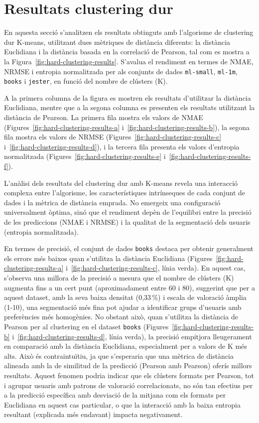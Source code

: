 \documentclass[a4paper,12pt]{report}
\begin{document}
\section{Resultats clustering dur}

En aquesta secció s'analitzen els resultats obtinguts amb l'algorisme de clustering dur K-means, utilitzant dues mètriques de distància diferents: la distància Euclidiana i la distància basada en la correlació de Pearson, tal com es mostra a la Figura~\ref{fig:hard-clustering-results}. S'avalua el rendiment en termes de NMAE, NRMSE i entropia normalitzada per als conjunts de dades \texttt{ml-small}, \texttt{ml-1m}, \texttt{books} i \texttt{jester}, en funció del nombre de clústers (K).

A la primera columna de la figura es mostren els resultats d'utilitzar la distància Euclidiana, mentre que a la segona columna es presenten els resultats utilitzant la distància de Pearson.
La primera fila mostra els valors de NMAE (Figures~\ref{fig:hard-clustering-results-a} i~\ref{fig:hard-clustering-results-b}), la segona fila mostra els valors de NRMSE (Figures~\ref{fig:hard-clustering-results-c} i~\ref{fig:hard-clustering-results-d}), i la tercera fila presenta els valors d'entropia normalitzada (Figures~\ref{fig:hard-clustering-results-e} i~\ref{fig:hard-clustering-results-f}).

L'anàlisi dels resultats del clustering dur amb K-means revela una interacció complexa entre l'algorisme, les característiques intrínseques de cada conjunt de dades i la mètrica de distància emprada. No emergeix una configuració universalment òptima, sinó que el rendiment depèn de l'equilibri entre la precisió de les prediccions (NMAE i NRMSE) i la qualitat de la segmentació dels usuaris (entropia normalitzada).

En termes de precisió, el conjunt de dades \texttt{books} destaca per obtenir generalment els errors més baixos quan s'utilitza la distància Euclidiana (Figures~\ref{fig:hard-clustering-results-a} i~\ref{fig:hard-clustering-results-c}, línia verda). En aquest cas, s'observa una millora de la precisió a mesura que el nombre de clústers (K) augmenta fins a un cert punt (aproximadament entre 60 i 80), suggerint que per a aquest dataset, amb la seva baixa densitat (0,33\,\%) i escala de valoració àmplia (1-10), una segmentació més fina pot ajudar a identificar grups d'usuaris amb preferències més homogènies. No obstant això, quan s'utilitza la distància de Pearson per al clustering en el dataset \texttt{books} (Figures~\ref{fig:hard-clustering-results-b} i~\ref{fig:hard-clustering-results-d}, línia verda), la precisió empitjora lleugerament en comparació amb la distància Euclidiana, especialment per a valors de K més alts. Això és contraintuïtiu, ja que s'esperaria que una mètrica de distància alineada amb la de similitud de la predicció (Pearson amb Pearson) oferís millors resultats. Aquest fenomen podria indicar que els clústers formats per Pearson, tot i agrupar usuaris amb patrons de valoració correlacionats, no són tan efectius per a la predicció específica amb desviació de la mitjana com els formats per Euclidiana en aquest cas particular, o que la interacció amb la baixa entropia resultant (explicada més endavant) impacta negativament.
\end{document}
